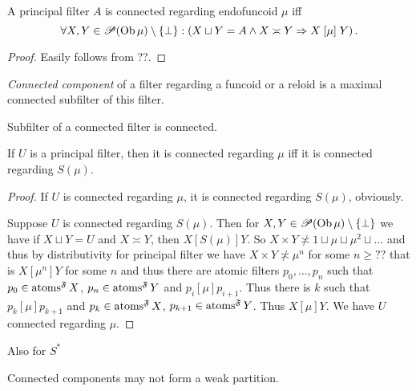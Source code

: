 \begin{prop}
  A principal filter $A$ is connected regarding endofuncoid $\mu$ iff
  \[ \forall X, Y \in \mathscr{P} (\operatorname{Ob} \mu) \setminus \{ \bot \} :
     \left( X \sqcup Y = A \wedge X \asymp Y \Rightarrow X \mathrel{[\mu]} Y
     \right) . \]
\end{prop}

\begin{proof}
  Easily follows from ??.
\end{proof}

\begin{defn}
  \emph{Connected component} of a filter regarding a funcoid or a reloid
  is a maximal
  connected subfilter of this filter.
\end{defn}

\begin{obvious}
Subfilter of a connected filter is connected.
\end{obvious}

\begin{prop}
  If $U$ is a principal filter, then it is connected regarding $\mu$ iff it is
  connected regarding $S (\mu)$.
\end{prop}

\begin{proof}
  If $U$ is connected regarding $\mu$, it is connected regarding $S (\mu)$,
  obviously.

  Suppose $U$ is connected regarding $S (\mu)$. Then for $X, Y \in \mathscr{P}
  (\operatorname{Ob} \mu) \setminus \{ \bot \}$ we have if $X \sqcup Y = U$ and $X
  \asymp Y$, then $X \mathrel{[S (\mu)]} Y$. So $X \times Y \nasymp 1 \sqcup
  \mu \sqcup \mu^2 \sqcup \ldots$ and thus by distributivity for principal
  filter we have $X \times Y \nasymp \mu^n$ for some $n \geq ? ?$ that is $X
  \mathrel{[\mu^n]} Y$ for some $n$ and thus there are atomic filters $p_0,
  \ldots, p_n$ such that $p_0 \in \operatorname{atoms}^{\mathfrak{F}} X$, $p_n \in
  \operatorname{atoms}^{\mathfrak{F}} Y$ and $p_i \mathrel{[\mu]} p_{i + 1}$. Thus
  there is $k$ such that $p_k \mathrel{[\mu]} p_{k + 1}$ and $p_k \in
  \operatorname{atoms}^{\mathfrak{F}} X$, $p_{k + 1} \in \operatorname{atoms}^{\mathfrak{F}}
  Y$. Thus $X \mathrel{[\mu]} Y$. We have $U$ connected regarding $\mu$.
\end{proof}

Also for $S^{\ast}$

\begin{example}
  Connected components may not form a weak partition.
\end{example}

